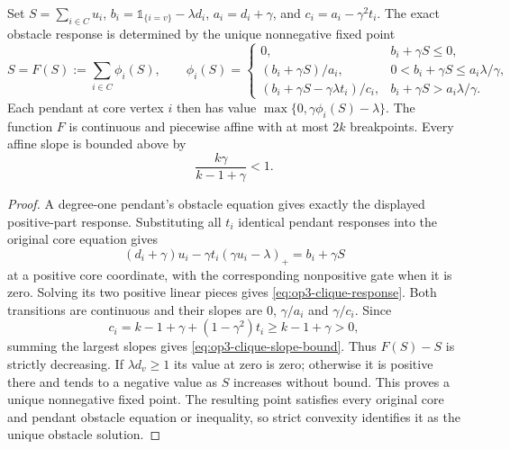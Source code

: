 \begin{lemma}
\label{lem:op3-clique-scalar-response}
Set $S=\sum_{i\in C}u_i$, $b_i=\mathbb 1_{\{i=v\}}-\lambda d_i$,
$a_i=d_i+\gamma$, and $c_i=a_i-\gamma^2t_i$. The exact obstacle response
is determined by the unique nonnegative fixed point
\begin{equation}
 S=F(S):=\sum_{i\in C}\phi_i(S),\qquad
 \phi_i(S)=
 \begin{cases}
 0,&b_i+\gamma S\leq0,\\
 (b_i+\gamma S)/a_i,&0<b_i+\gamma S\leq a_i\lambda/\gamma,\\
 (b_i+\gamma S-\gamma\lambda t_i)/c_i,
       &b_i+\gamma S>a_i\lambda/\gamma.
 \end{cases}
 \label{eq:op3-clique-response}
\end{equation}
Each pendant at core vertex $i$ then has value
$\max\{0,\gamma\phi_i(S)-\lambda\}$.
The function $F$ is continuous and piecewise affine with at most $2k$
breakpoints. Every affine slope is bounded above by
\begin{equation}
 \frac{k\gamma}{k-1+\gamma}<1.
 \label{eq:op3-clique-slope-bound}
\end{equation}
\end{lemma}
\begin{proof}
A degree-one pendant's obstacle equation gives exactly the displayed
positive-part response. Substituting all $t_i$ identical pendant responses
into the original core equation gives
\[
 (d_i+\gamma)u_i-\gamma t_i(\gamma u_i-\lambda)_+
     =b_i+\gamma S
\]
at a positive core coordinate, with the corresponding nonpositive gate
when it is zero. Solving its two positive linear pieces gives
\cref{eq:op3-clique-response}. Both transitions are continuous and their
slopes are $0$, $\gamma/a_i$ and $\gamma/c_i$. Since
\[
 c_i=k-1+\gamma+(1-\gamma^2)t_i\geq k-1+\gamma>0,
\]
summing the largest slopes gives \cref{eq:op3-clique-slope-bound}.
Thus $F(S)-S$ is strictly decreasing. If $\lambda d_v\geq1$ its value
at zero is zero; otherwise it is positive there and tends to a negative
value as $S$ increases without bound. This proves a unique nonnegative
fixed point. The resulting point satisfies every original core and pendant
obstacle equation or inequality, so strict convexity identifies it as the
unique obstacle solution.
\end{proof}

